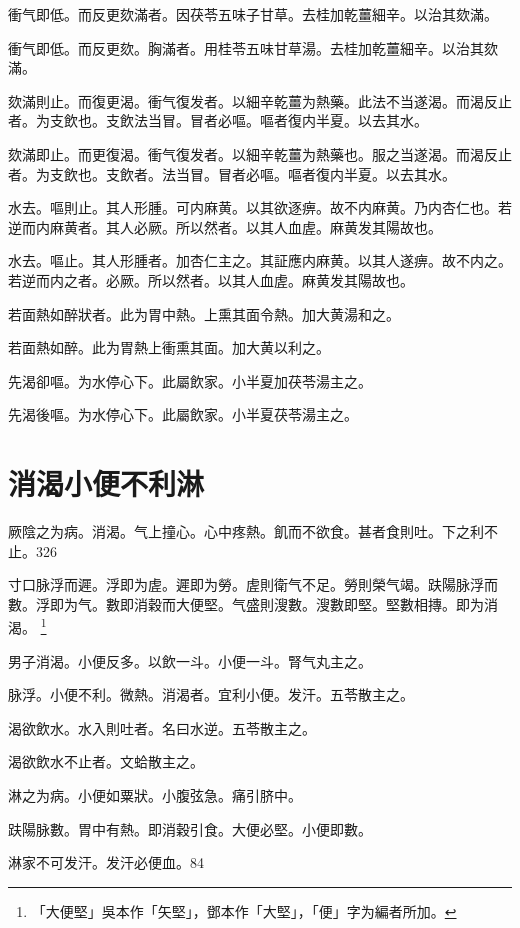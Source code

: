 衝气即低。而反更欬滿者。因茯苓五味子甘草。去桂加乾薑細辛。以治其欬滿。{\wuben}

衝气即低。而反更欬。胸滿者。用桂苓五味甘草湯。去桂加乾薑細辛。以治其欬滿。{\dengben}

欬滿則止。而復更渴。衝气復发者。以細辛乾薑为熱藥。此法不当遂渴。而渴反止者。为支飲也。支飲法当冒。冒者必嘔。嘔者復内半夏。以去其水。{\wuben}

欬滿即止。而更復渴。衝气復发者。以細辛乾薑为熱藥也。服之当遂渴。而渴反止者。为支飲也。支飲者。法当冒。冒者必嘔。嘔者復内半夏。以去其水。{\dengben}

水去。嘔則止。其人形腫。可内麻黄。以其欲逐痹。故不内麻黄。乃内杏仁也。若逆而内麻黄者。其人必厥。所以然者。以其人血虗。麻黄发其陽故也。{\wuben}

水去。嘔止。其人形腫者。加杏仁主之。其証應内麻黄。以其人遂痹。故不内之。若逆而内之者。必厥。所以然者。以其人血虗。麻黄发其陽故也。{\dengben}

若面熱如醉狀者。此为胃中熱。上熏其面令熱。加大黄湯和之。{\wuben}

若面熱如醉。此为胃熱上衝熏其面。加大黄以利之。{\dengben}

先渴卻嘔。为水停心下。此屬飲家。小半夏加茯苓湯主之。{\wuben}

先渴後嘔。为水停心下。此屬飲家。小半夏茯苓湯主之。{\dengben}

\chapter{消渴小便{\khaaitp 不}利淋}

厥陰之为病。消渴。气上撞{\khaaitp 心}。心中疼熱。飢而不欲食。{\khaaitp 甚者}食則吐。下之利不止。326

寸口脉浮而遲。浮即为虗。遲即为勞。虗則衛气不足。勞則榮气竭。趺陽脉浮而數。浮即为气。數即消穀而大{\khaaitp 便}堅。气盛則溲數。溲數即堅。堅數相摶。即为消渴。
	\footnote{
		「大便堅」吳本作「矢堅」，鄧本作「大堅」，「便」字为編者所加。
	}

男子消渴。小便反多。以飲一斗。小便一斗。腎气丸主之。

脉浮。小便不利。微熱。消渴者。宜利小便。发汗。五苓散主之。

渴欲飲水。水入則吐者。名曰水逆。五苓散主之。

渴欲飲水不止者。文蛤散主之。

淋之为病。小便如粟狀。小腹弦急。痛引脐中。

趺陽脉數。胃中有熱。即消穀引食。大便必堅。小便即數。

淋家不可发汗。发汗必便血。84

